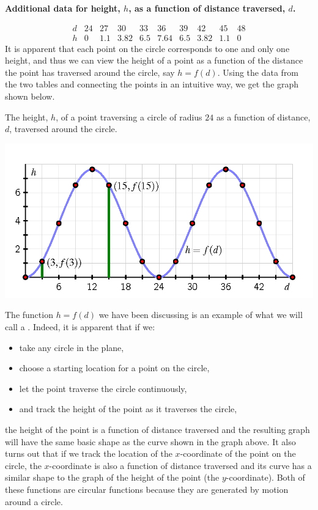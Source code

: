 \documentclass[nooutcomes, noauthor]{ximera}
\begin{document}
\begin{center}
\textbf{Additional data for height, \(h\), as a function of distance traversed, \(d\).}
\end{center}
$$
\begin{array}{cccccccccc}
d&24&27&30&33&36&39&42&45&48\\
\hline
h&0&1.1&3.82&6.5&7.64&6.5&3.82&1.1&0
\end{array}
$$
It is apparent that each point on the circle corresponds to one and only one height, and thus we can view the height of a point as a function of the distance the point has traversed around the circle, say \(h = f(d)\).  Using the data from the two tables and connecting the points in an intuitive way, we get the graph shown below.%

\begin{center}
The height, \(h\), of a point traversing a circle of radius \(24\) as a function of distance, \(d\), traversed around the circle.
\end{center}

\begin{image}
\includegraphics{traversing-first-example-graph.png}
\end{image}

The function \(h = f(d)\) we have been discussing is an example of what we will call a .  Indeed, it is apparent that if we:
\begin{itemize}[label=\textbullet]
\item
take any circle in the plane,%
\item
choose a starting location for a point on the circle,%
\item
let the point traverse the circle continuously,%
\item
and track the height of the point as it traverses the circle,%
\end{itemize}
the height of the point is a function of distance traversed and the resulting graph will have the same basic shape as the curve shown in the graph above.  It also turns out that if we track the location of the \(x\)-coordinate of the point on the circle, the \(x\)-coordinate is also a function of distance traversed and its curve has a similar shape to the graph of the height of the point (the \(y\)-coordinate).  Both of these functions are circular functions because they are generated by motion around a circle.
\end{document}
